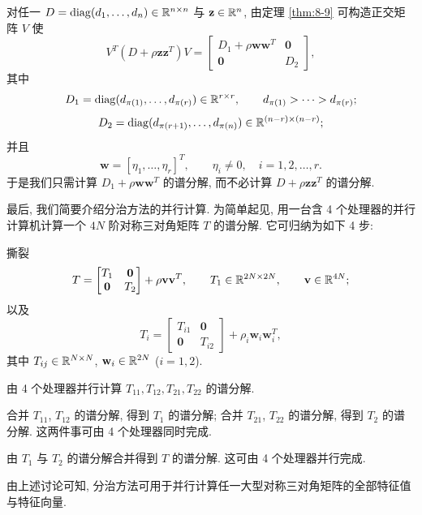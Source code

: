 对任一 $D=\operatorname{diag}(d_1,\ldots,d_n)\in\mathbb{R}^{n\times n}$ 与 $\mathbf{z}\in\mathbb{R}^n$, 由定理 \ref{thm:8-9} 可构造正交矩阵 $V$ 使
\[
  V^T(D+\rho\mathbf{z}\mathbf{z}^T)V=
  \begin{bmatrix}
    D_1+\rho\mathbf{w}\mathbf{w}^T & \mathbf{0}\\
    \mathbf{0} & D_2
  \end{bmatrix},
\]
其中
\[
  D_1=\operatorname{diag}(d_{\pi(1)},\ldots,d_{\pi(r)})\in\mathbb{R}^{r\times r},
  \qquad
  d_{\pi(1)}>\cdots>d_{\pi(r)};
\]
\[
  D_2=\operatorname{diag}(d_{\pi(r+1)},\ldots,d_{\pi(n)})\in\mathbb{R}^{(n-r)\times(n-r)};
\]
并且
\[
  \mathbf{w}=[\eta_1,\ldots,\eta_r]^T,
  \qquad
  \eta_i\neq0,\quad i=1,2,\ldots,r.
\]
于是我们只需计算 $D_1+\rho\mathbf{w}\mathbf{w}^T$ 的谱分解, 而不必计算 $D+\rho\mathbf{z}\mathbf{z}^T$ 的谱分解.

最后, 我们简要介绍分治方法的并行计算. 为简单起见, 用一台含 4 个处理器的并行计算机计算一个 $4N$ 阶对称三对角矩阵 $T$ 的谱分解. 它可归纳为如下 4 步:
\begin{parenlist}
  \item 撕裂
    \[
      T=\begin{bmatrix}
        T_1 & \mathbf{0}\\
        \mathbf{0} & T_2
      \end{bmatrix}+\rho\mathbf{v}\mathbf{v}^T,
      \qquad
      T_1\in\mathbb{R}^{2N\times2N},
      \qquad
      \mathbf{v}\in\mathbb{R}^{4N};
    \]
    以及
    \[
      T_i=\begin{bmatrix}
        T_{i1} & \mathbf{0}\\
        \mathbf{0} & T_{i2}
      \end{bmatrix}+\rho_i\mathbf{w}_i\mathbf{w}_i^T,
    \]
    其中 $T_{ij}\in\mathbb{R}^{N\times N}$, $\mathbf{w}_i\in\mathbb{R}^{2N}$ ($i=1,2$).
  \item 由 4 个处理器并行计算 $T_{11},T_{12},T_{21},T_{22}$ 的谱分解.
  \item 合并 $T_{11}$, $T_{12}$ 的谱分解, 得到 $T_1$ 的谱分解; 合并 $T_{21}$, $T_{22}$ 的谱分解, 得到 $T_2$ 的谱分解. 这两件事可由 4 个处理器同时完成.
  \item 由 $T_1$ 与 $T_2$ 的谱分解合并得到 $T$ 的谱分解. 这可由 4 个处理器并行完成.
\end{parenlist}

由上述讨论可知, 分治方法可用于并行计算任一大型对称三对角矩阵的全部特征值与特征向量.

